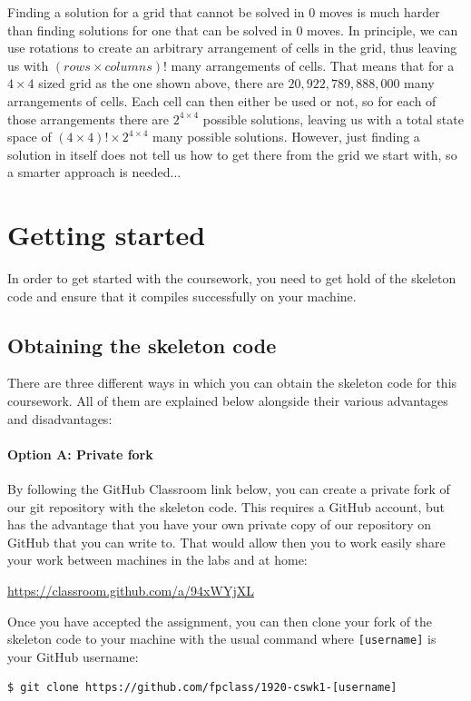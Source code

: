 Finding a solution for a grid that cannot be solved in 0 moves is much harder than finding solutions for one that can be solved in 0 moves. In principle, we can use rotations to create an arbitrary arrangement of cells in the grid, thus leaving us with $(\mathit{rows} \times \mathit{columns})!$ many arrangements of cells. That means that for a $4 \times 4$ sized grid as the one shown above, there are $20,922,789,888,000$ many arrangements of cells. Each cell can then either be used or not, so for each of those arrangements there are $2^{4 \times 4}$ possible solutions, leaving us with a total state space of $(4 \times 4)! \times 2^{4 \times 4}$ many possible solutions. However, just finding a solution in itself does not tell us how to get there from the grid we start with, so a smarter approach is needed...


\section{Getting started}
\label{sec:cswk1-getting-started}

In order to get started with the coursework, you need to get hold of the skeleton code and ensure that it compiles successfully on your machine. 

\subsection{Obtaining the skeleton code}

There are three different ways in which you can obtain the skeleton code for this coursework. All of them are explained below alongside their various advantages and disadvantages:

\paragraph{Option A: Private fork} By following the GitHub Classroom link below, you can create a private fork of our git repository with the skeleton code. This requires a GitHub account, but has the advantage that you have your own private copy of our repository on GitHub that you can write to. That would allow then you to work easily share your work between machines in the labs and at home:
\begin{center}
	\url{https://classroom.github.com/a/94xWYjXL}
\end{center}
Once you have accepted the assignment, you can then clone your fork of the skeleton code to your machine with the usual  command where \texttt{\small [username]} is your GitHub username:
\begin{verbatim}
$ git clone https://github.com/fpclass/1920-cswk1-[username]
\end{verbatim}
